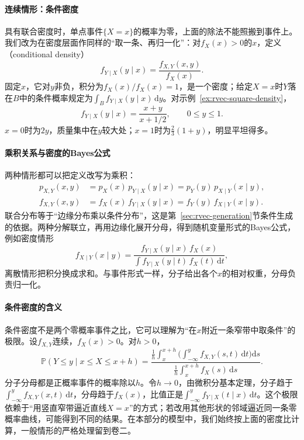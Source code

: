 \paragraph{连续情形：条件密度}
具有联合密度时，单点事件$\{X=x\}$的概率为零，上面的除法不能照搬到事件上。我们改为在密度层面作同样的“取一条、再归一化”：对$f_X(x)>0$的$x$，定义（conditional density）
\[
 f_{Y\mid X}(y\mid x)=\frac{f_{X,Y}(x,y)}{f_X(x)} .
\]
固定$x$，它对$y$非负，积分为$f_X(x)/f_X(x)=1$，是一个密度；给定$X=x$时$Y$落在$B$中的条件概率规定为$\int_Bf_{Y\mid X}(y\mid x)\,\mathrm dy$。对示例~\ref{ex:rvec-square-density}，
\[
 f_{Y\mid X}(y\mid x)=\frac{x+y}{x+1/2},\qquad 0\le y\le1 .
\]
$x=0$时为$2y$，质量集中在$y$较大处；$x=1$时为$\frac23(1+y)$，明显平坦得多。

\paragraph{乘积关系与密度的Bayes公式}
两种情形都可以把定义改写为乘积：
\[
\begin{aligned}
 p_{X,Y}(x,y)&=p_X(x)\,p_{Y\mid X}(y\mid x)=p_Y(y)\,p_{X\mid Y}(x\mid y),\\
 f_{X,Y}(x,y)&=f_X(x)\,f_{Y\mid X}(y\mid x)=f_Y(y)\,f_{X\mid Y}(x\mid y).
\end{aligned}
\]
联合分布等于“边缘分布乘以条件分布”，这是第~\ref{sec:rvec-generation}节条件生成的依据。两种分解联立，再用边缘化展开分母，得到随机变量形式的Bayes公式，例如密度情形
\[
 f_{X\mid Y}(x\mid y)=\frac{f_{Y\mid X}(y\mid x)\,f_X(x)}{\int f_{Y\mid X}(y\mid t)\,f_X(t)\,\mathrm dt} ,
\]
离散情形把积分换成求和。与事件形式一样，分子给出各个$x$的相对权重，分母负责归一化。

\paragraph{条件密度的含义}
条件密度不是两个零概率事件之比，它可以理解为“在$x$附近一条窄带中取条件”的极限。设$f_{X,Y}$连续，$f_X(x)>0$。对$h>0$，
\[
 \mathbb P(Y\le y\mid x\le X\le x+h)
 =\frac{\frac1h\int_x^{x+h}\bigl(\int_{-\infty}^yf_{X,Y}(s,t)\,\mathrm dt\bigr)\mathrm ds}{\frac1h\int_x^{x+h}f_X(s)\,\mathrm ds} .
\]
分子分母都是正概率事件的概率除以$h$。令$h\to0$，由微积分基本定理，分子趋于$\int_{-\infty}^yf_{X,Y}(x,t)\,\mathrm dt$，分母趋于$f_X(x)$，比值正是$\int_{-\infty}^yf_{Y\mid X}(t\mid x)\,\mathrm dt$。这个极限依赖于“用竖直窄带逼近直线$X=x$”的方式；若改用其他形状的邻域逼近同一条零概率曲线，可能得到不同的结果。在本部分的模型中，我们始终按上面的密度比计算，一般情形的严格处理留到卷二。

